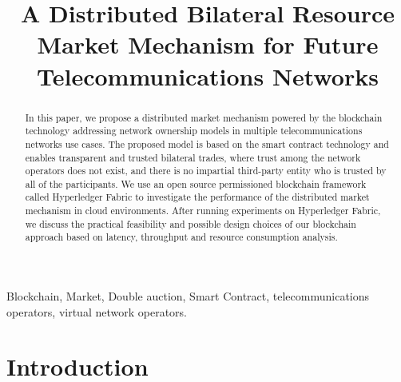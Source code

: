 \documentclass[conference]{IEEEtran}
\begin{document}
\title{A Distributed Bilateral Resource Market Mechanism for Future Telecommunications Networks}
\author{
}


\maketitle

\begin{abstract}
In this paper, we propose a distributed market mechanism powered by the blockchain technology addressing network ownership models in multiple telecommunications networks use cases. The proposed model is based on the smart contract technology and enables transparent and trusted bilateral trades, where trust among the network operators does not exist, and there is no impartial third-party entity who is trusted by all of the participants. We use an open source permissioned blockchain framework called Hyperledger Fabric to investigate the performance of the distributed market mechanism in cloud environments. After running experiments on Hyperledger Fabric, we discuss the practical feasibility and possible design choices of our blockchain approach based on latency, throughput and resource consumption analysis.

\end{abstract}

\begin{IEEEkeywords}
Blockchain, Market, Double auction, Smart Contract, telecommunications operators, virtual network operators.
\end{IEEEkeywords}

\section{Introduction}
\end{document}

